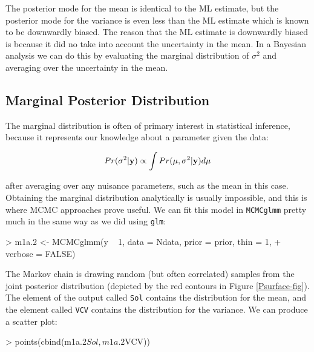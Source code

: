 \documentclass{article}
\begin{document}
\iftalk
\else
\fi

The posterior mode for the mean is identical to the ML estimate, but the posterior mode for the variance is even less than the ML estimate which is known to be downwardly biased. The reason that the ML estimate is downwardly biased is because it did no take into account the uncertainty in the mean. In a Bayesian analysis we can do this by evaluating the marginal distribution of $\sigma^{2}$ and averaging over the uncertainty in the mean.

\subsection{Marginal Posterior Distribution}

The marginal distribution is often of primary interest in statistical inference, because it represents our knowledge about a parameter given the data: 

\begin{displaymath}
Pr(\sigma^{2} | {\bf y}) \propto \int Pr(\mu, \sigma^{2} | {\bf y})d\mu
\label{marg-eq}
\end{displaymath}

after averaging over any nuisance parameters, such as the mean in this case.\\  

Obtaining the marginal distribution analytically is usually impossible, and this is where MCMC approaches prove useful.  We can fit this model in \texttt{MCMCglmm} pretty much in the same way as we did using \texttt{glm}:


\begin{Schunk}
\begin{Sinput}
> m1a.2 <- MCMCglmm(y ~ 1, data = Ndata, prior = prior, thin = 1, 
+     verbose = FALSE)
\end{Sinput}
\end{Schunk}

The Markov chain is drawing random (but often correlated) samples from the joint posterior distribution (depicted by the red contours in Figure \ref{Psurface-fig}).  The element of the output called \texttt{Sol} contains the distribution for the mean, and the element called \texttt{VCV} contains the distribution for the variance. We can produce a scatter plot:

\begin{Schunk}
\begin{Sinput}
> points(cbind(m1a.2$Sol, m1a.2$VCV))
\end{Sinput}
\end{Schunk}
\end{document}
